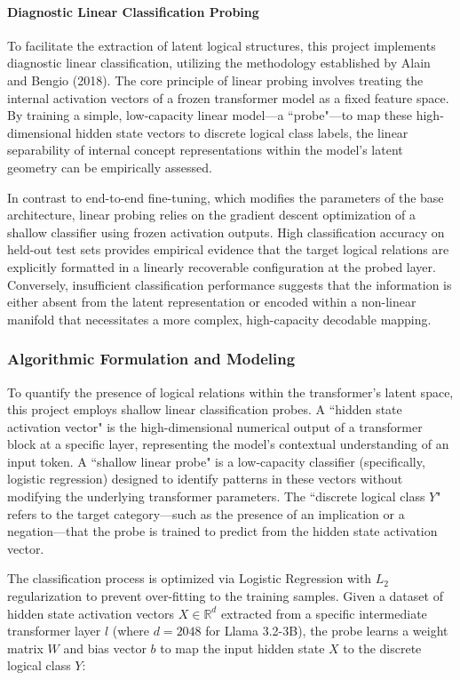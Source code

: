 \documentclass[12 pt]{article}  %
\newcommand{\Reals}[0]{\mathbb{R}}      %
\begin{document}
\paragraph{Diagnostic Linear Classification Probing}
To facilitate the extraction of latent logical structures, this project 
implements diagnostic linear classification, utilizing the methodology 
established by Alain and Bengio (2018). The core principle of linear probing 
involves treating the internal activation vectors of a frozen transformer model 
as a fixed feature space. By training a simple, low-capacity linear model—a 
``probe"—to map these high-dimensional hidden state vectors to discrete logical 
class labels, the linear separability of internal concept representations within 
the model's latent geometry can be empirically assessed.

In contrast to end-to-end fine-tuning, which modifies the parameters of the base 
architecture, linear probing relies on the gradient descent optimization of a 
shallow classifier using frozen activation outputs. High classification accuracy 
on held-out test sets provides empirical evidence that the target logical 
relations are explicitly formatted in a linearly recoverable configuration at 
the probed layer. Conversely, insufficient classification performance suggests 
that the information is either absent from the latent representation or encoded 
within a non-linear manifold that necessitates a more complex, high-capacity 
decodable mapping.

\subsubsection{Algorithmic Formulation and Modeling}
To quantify the presence of logical relations within the transformer's latent 
space, this project employs shallow linear classification probes. A ``hidden 
state activation vector" is the high-dimensional numerical output of a 
transformer block at a specific layer, representing the model's contextual 
understanding of an input token. A ``shallow linear probe" is a low-capacity 
classifier (specifically, logistic regression) designed to identify patterns in 
these vectors without modifying the underlying transformer parameters. The 
``discrete logical class $Y$" refers to the target category—such as the presence 
of an implication or a negation—that the probe is trained to predict from the 
hidden state activation vector.

The classification process is optimized via Logistic Regression with $L_2$ 
regularization to prevent over-fitting to the training samples. Given a dataset 
of hidden state activation vectors $X \in \Reals^{d}$ extracted from a specific 
intermediate transformer layer $l$ (where $d = 2048$ for Llama 3.2-3B), the 
probe learns a weight matrix $W$ and bias vector $b$ to map the input hidden 
state $X$ to the discrete logical class $Y$:
\end{document}
